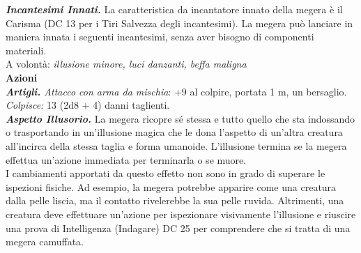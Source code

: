 \begin{multicols}{2}
\emph{\textbf{Incantesimi Innati.}} La caratteristica da incantatore innato della megera è il Carisma (DC  13 per i Tiri Salvezza degli incantesimi). La megera può lanciare in maniera innata i seguenti incantesimi, senza aver bisogno di componenti materiali.\\

A volontà: \emph{illusione minore, luci danzanti, beffa maligna}\\

\smallskip\textbf{Azioni}\\

\emph{\textbf{Artigli.} Attacco con arma da mischia}: +9 al colpire, portata 1 m, un bersaglio.\\

\emph{Colpisce:} 13 (2d8 + 4) danni taglienti.\\

\emph{\textbf{Aspetto Illusorio.}} La megera ricopre sé stessa e tutto quello che sta indossando o trasportando in un'illusione magica che le dona l'aspetto di un'altra creatura all'incirca della stessa taglia e forma umanoide. L'illusione termina se la megera effettua un'azione immediata per terminarla o se muore.\\

I cambiamenti apportati da questo effetto non sono in grado di superare le ispezioni fisiche. Ad esempio, la megera potrebbe apparire come una creatura dalla pelle liscia, ma il contatto rivelerebbe la sua pelle ruvida. Altrimenti, una creatura deve effettuare un'azione per ispezionare visivamente l'illusione e riuscire una prova di Intelligenza (Indagare) DC  25 per comprendere che si tratta di una megera camuffata.\\


\end{multicols}
